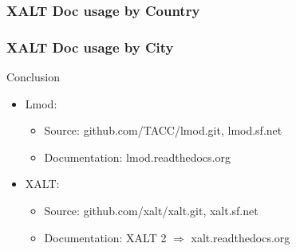 \documentclass{beamer}
\begin{document}
\begin{frame}[fragile]
    \frametitle{XALT Doc usage by Country}
\end{frame}

\begin{frame}[fragile]
    \frametitle{XALT Doc usage by City}
\end{frame}

\begin{frame}{Conclusion}
  \begin{itemize}
    \item Lmod:
      \begin{itemize}
        \item Source: github.com/TACC/lmod.git, lmod.sf.net
        \item Documentation: lmod.readthedocs.org
      \end{itemize}
    \item XALT:
      \begin{itemize}
        \item Source: github.com/xalt/xalt.git, xalt.sf.net
        \item Documentation: XALT 2 $\Rightarrow$ xalt.readthedocs.org
      \end{itemize}
  \end{itemize}
\end{frame}

%
\end{document}
